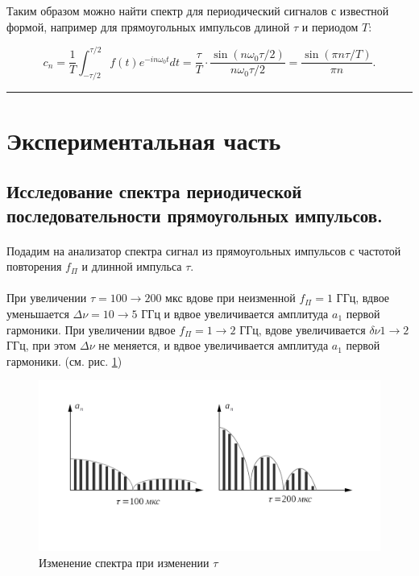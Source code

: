 \documentclass[a4paper,12pt]{article} %
\begin{document}
Таким образом можно найти спектр для периодический сигналов с известной формой, например для прямоугольных импульсов длиной $\tau$ и периодом $T$:

\[ c_n = \frac{1}{T}\int_{-\tau/2}^{\tau/2} f(t) e^{-in \omega_0 t} dt = \frac{\tau}{T} \cdot\frac{\sin(n\omega_0 \tau/2)}{n\omega_0 \tau/2} = \frac{\sin (\pi n \tau / T)}{\pi n}.\]

\medskip\hrule\medskip

\section{Экспериментальная часть}

\subsection{Исследование спектра периодической последовательности прямоугольных импульсов.}

\paragraph{} Подадим на анализатор спектра сигнал из прямоугольных импульсов с частотой повторения $f_\Pi$ и длинной импульса $\tau$.

\paragraph{} При увеличении $\tau = 100 \rightarrow 200$ мкс вдове при неизменной $f_\Pi = 1$ ГГц, вдвое уменьшается $\Delta \nu = 10 \rightarrow 5$ ГГц и вдвое увеличивается амплитуда $a_1$ первой гармоники. При увеличении вдвое $f_\Pi = 1 \rightarrow 2$ ГГц, вдове увеличивается $\delta \nu 1 \rightarrow 2$ ГГц, при этом $\Delta \nu$ не меняется, и вдвое увеличивается амплитуда $a_1$ первой гармоники. (см. рис. \ref{fig:img1})

\begin{figure}[h]
\begin{center}
\includegraphics[width=6in]{image 1.png}
\caption{Изменение спектра при изменении $\tau$}
\label{fig:img1}
\end{center}
\end{figure}
\end{document}
